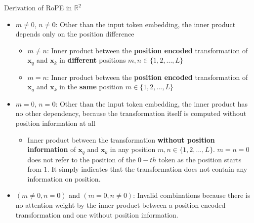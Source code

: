 \documentclass{beamer}
\begin{document}
	\begin{frame}{Derivation of RoPE in $\mathbb{R}^2$}\label{page:rope_transform_cases}
		\begin{itemize}				
			\item $m\ne 0$, $n\ne 0$: Other than the input token embedding, the inner product depends only on the position difference
			\begin{itemize}
				\item $m\ne n$: Inner product between the \textbf{position encoded} transformation of $\mathbf{x}_q$ and $\mathbf{x}_k$ in \textbf{different} positions $m, n \in\{1,2,...,L\}$
				\item $m= n$: Inner product between the \textbf{position encoded} transformation of $\mathbf{x}_q$ and $\mathbf{x}_k$ in the \textbf{same} position $m\in\{1,2,...,L\}$
			\end{itemize}
			\item $m= 0$, $n= 0$: Other than the input token embedding, the inner product has no other dependency, because the transformation itself is computed without position information at all
			\begin{itemize}
				\item Inner product between the transformation \textbf{without position information} of $\mathbf{x}_q$ and $\mathbf{x}_k$ in any position $m, n \in\{1,2,...,L\}$. $m=n=0$ does not refer to the position of the $0-th$ token as the position starts from $1$. It simply indicates that the transformation does not contain any information on position.
			\end{itemize}
			\item $(m\ne 0, n= 0)$ and $(m= 0, n\ne 0)$: Invalid combinations because there is no attention weight by the inner product between a position encoded transformation and one without position information.
		\end{itemize}
	\end{frame}
		
	
\end{document}
